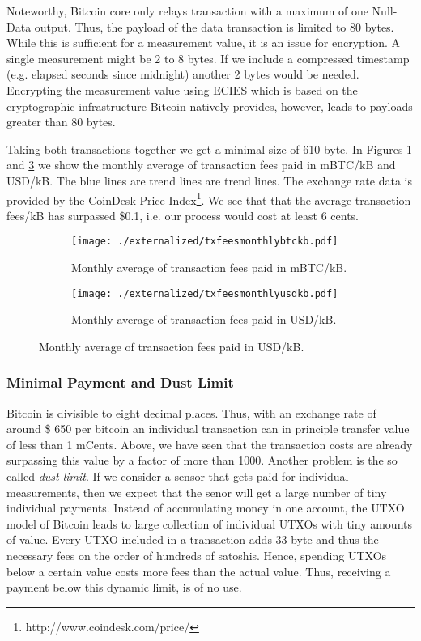 Noteworthy, Bitcoin core only relays transaction with a maximum of one Null-Data output. Thus, the payload of the data transaction is limited to 80 bytes. While this is sufficient for a measurement value, it is an issue for encryption. A single measurement might be 2 to 8 bytes. If we include a compressed timestamp (e.g. elapsed seconds since midnight) another 2 bytes would be needed. Encrypting the measurement value using \ac{ECIES} which is based on the cryptographic infrastructure Bitcoin natively provides, however, leads to payloads greater than 80 bytes.

Taking both transactions together we get a minimal size of 610 byte. In Figures \ref{fig:tx_fees_btc} and \ref{fig:tx_fees_usd} we show the monthly average of transaction fees paid in mBTC/kB and USD/kB. The blue lines are trend lines are trend lines. The exchange rate data is provided by the CoinDesk Price Index\footnote{http://www.coindesk.com/price/}. We see that that the average transaction fees/kB has surpassed \$0.1, i.e. our process would cost at least 6 cents.

\begin{figure}[ht]
  \centering
  \begin{subfigure}[t]{0.5\linewidth}
    \centering\texttt{[image: ./externalized/txfeesmonthlybtckb.pdf]}
    \caption{Monthly average of transaction fees paid in mBTC/kB.
    \label{fig:tx_fees_btc}}
  \end{subfigure}%
  \begin{subfigure}[t]{0.5\linewidth}
    \centering\texttt{[image: ./externalized/txfeesmonthlyusdkb.pdf]}
    \caption{Monthly average of transaction fees paid in USD/kB.
    \label{fig:tx_fees_usd}}
  \end{subfigure}
\end{figure}

\subsubsection{Minimal Payment and Dust Limit}

Bitcoin is divisible to eight decimal places. Thus, with an exchange rate of around \$ 650 per bitcoin an individual transaction can in principle transfer value of less than 1 mCents. Above, we have seen that the transaction costs are already surpassing this value by a factor of more than 1000. Another problem is the so called \emph{dust limit}. If we consider a sensor that gets paid for individual measurements, then we expect that the senor will get a large number of tiny individual payments. Instead of accumulating money in one account, the \ac{UTXO} model of Bitcoin leads to large collection of individual \ac{UTXO}s with tiny amounts of value. Every \ac{UTXO} included in a transaction adds 33 byte and thus the necessary fees on the order of hundreds of satoshis. Hence, spending \ac{UTXO}s below a certain value costs more fees than the actual value. Thus, receiving a payment below this dynamic limit, is of no use.

